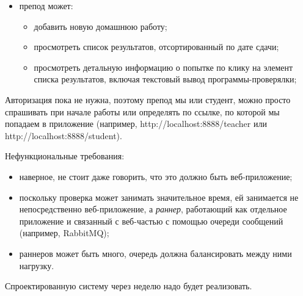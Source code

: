 \documentclass[a5paper]{homework}
\begin{document}
\begin{itemize}
\begin{itemize}
    \end{itemize}
    \item препод может:
    \begin{itemize}
        \item добавить новую домашнюю работу;
        \item просмотреть список результатов, отсортированный по дате сдачи;
        \item просмотреть детальную информацию о попытке по клику на элемент списка результатов, включая текстовый вывод программы-проверялки;
    \end{itemize}
\end{itemize}

Авторизация пока не нужна, поэтому препод мы или студент, можно просто спрашивать при начале работы или определять по ссылке, по которой мы попадаем в приложение (например, http://localhost:8888/teacher или http://localhost:8888/student).

Нефункциональные требования:

\begin{itemize}
    \item наверное, не стоит даже говорить, что это должно быть веб-приложение;
    \item поскольку проверка может занимать значительное время, ей занимается не непосредственно веб-приложение, а \emph{раннер}, работающий как отдельное приложение и связанный с веб-частью с помощью очереди сообщений (например, RabbitMQ);
    \item раннеров может быть много, очередь должна балансировать между ними нагрузку.
\end{itemize}

Спроектированную систему через неделю надо будет реализовать.
\end{document}
